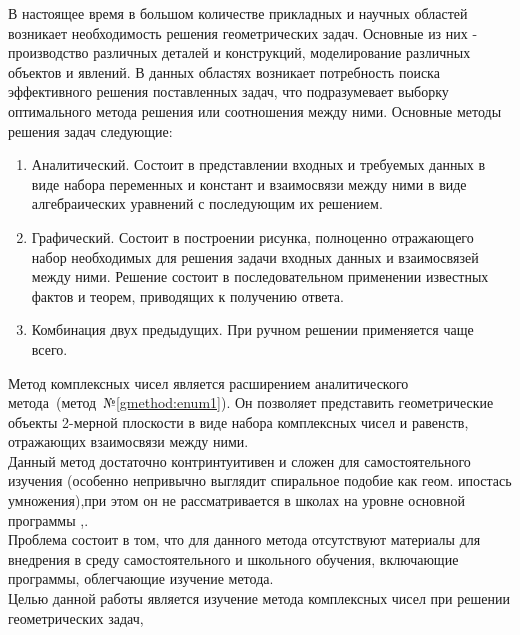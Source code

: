 


\lstset{language=[11]C++}


\thispagestyle{empty}
\clearpage

\tableofcontents

В настоящее время в большом количестве прикладных и научных областей возникает необходимость решения
геометрических задач. Основные из них - производство различных деталей и конструкций, моделирование
различных объектов и явлений. В данных областях возникает потребность поиска эффективного решения
поставленных задач, что подразумевает выборку оптимального метода решения или соотношения между ними.
Основные методы решения задач следующие\cite{geom:methods}:
\begin{enumerate}
   \item Аналитический. Состоит в представлении входных и требуемых данных в виде набора переменных и
         констант и взаимосвязи между ними в виде алгебраических уравнений с последующим их решением.
         \label{gmethod:enum1}
   \item Графический. Состоит в построении рисунка, полноценно отражающего набор необходимых для
         решения задачи входных данных и взаимосвязей между ними. Решение состоит в последовательном
         применении известных фактов и теорем, приводящих к получению ответа.
   \item Комбинация двух предыдущих. При ручном решении применяется чаще всего.
\end{enumerate}
Метод комплексных чисел является расширением аналитического метода~(метод~№\ref{gmethod:enum1}).
Он позволяет представить геометрические объекты 2-мерной плоскости в виде набора комплексных
чисел и равенств, отражающих взаимосвязи между ними.\\
Данный метод достаточно контринтуитивен и сложен для самостоятельного изучения (особенно
непривычно выглядит спиральное подобие как геом. ипостась умножения),при этом он не рассматривается
в школах на уровне основной программы \cite{edu:problem},\cite[стр.6]{book:ponarin}.\\
Проблема состоит в том, что для данного метода отсутствуют материалы для внедрения в среду
самостоятельного и школьного обучения, включающие программы, облегчающие изучение метода.\\
Целью данной работы является изучение метода комплексных чисел при решении геометрических задач,
